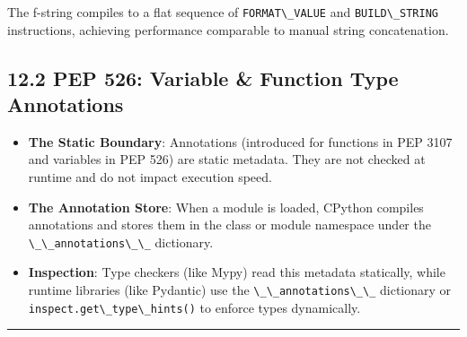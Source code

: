 The f-string compiles to a flat sequence of
\passthrough{\lstinline!FORMAT\_VALUE!} and
\passthrough{\lstinline!BUILD\_STRING!} instructions, achieving
performance comparable to manual string concatenation.

\hypertarget{pep-526-variable-function-type-annotations}{%
\subsection{12.2 PEP 526: Variable \& Function Type
Annotations}\label{pep-526-variable-function-type-annotations}}

\begin{itemize}
\tightlist
\item
  \textbf{The Static Boundary}: Annotations (introduced for functions in
  PEP 3107 and variables in PEP 526) are static metadata. They are not
  checked at runtime and do not impact execution speed.
\item
  \textbf{The Annotation Store}: When a module is loaded, CPython
  compiles annotations and stores them in the class or module namespace
  under the \passthrough{\lstinline!\_\_annotations\_\_!} dictionary.
\item
  \textbf{Inspection}: Type checkers (like Mypy) read this metadata
  statically, while runtime libraries (like Pydantic) use the
  \passthrough{\lstinline!\_\_annotations\_\_!} dictionary or
  \passthrough{\lstinline!inspect.get\_type\_hints()!} to enforce types
  dynamically.
\end{itemize}

\begin{center}\rule{0.5\linewidth}{0.5pt}\end{center}

